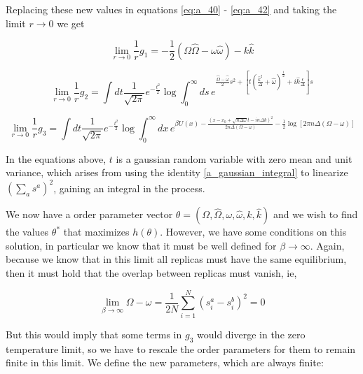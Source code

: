 Replacing these new values in equations \eqref{eq:a_40} - \eqref{eq:a_42} and taking the limit $r\to 0$ we get

\begin{equation}
  \label{eq:a_46}
  \lim_{r\to 0} \frac{1}{r} g_1 = -\frac{1}{2}\left(\Omega\hat{\Omega}
    - \omega \hat{\omega}\right) - k\hat{k}
\end{equation}

\begin{equation}
  \label{eq:a_47}
  \lim_{r\to 0} \frac{1}{r} g_2 = \int dt \frac{1}{\sqrt{2\pi}}
  e^{-\frac{t^2}{2}} \log \int_0^\infty ds \, e^{\frac{\hat{\Omega} -
      \hat{\omega}}{2} s^2 + \left[t\left(\frac{\hat{k}^2}{\Delta} +
      \hat{\omega}\right)^{\frac{1}{2}} +
    i\hat{k}\frac{\epsilon}{\Delta}\right] s}
\end{equation}

\begin{equation}
  \label{eq:a_47}
  \lim_{r\to 0} \frac{1}{r} g_3 = \int dt \frac{1}{\sqrt{2\pi}}
  e^{-\frac{t^2}{2}} \log \int_0^\infty dx \, e^{\beta U(x) -
    \frac{\left(x-x_0 + \sqrt{n\Delta \omega} t - i n \Delta
        k\right)^2}{2n\Delta(\Omega - \omega)} - \frac{1}{2} \log[2\pi
    n \Delta(\Omega - \omega)]}
\end{equation}

In the equations above, $t$ is a gaussian random variable with zero mean and unit variance, which arises from using the identity \eqref{a_gaussian_integral} to linearize $\left(\sum_a s^a\right)^2$, gaining an integral in the process.

We now have a order parameter vector $\theta = (\Omega, \hat{\Omega}, \omega, \hat{\omega}, k, \hat{k})$ and we wish to find the values $\theta^\ast$ that maximizes $h(\theta)$. However, we have some conditions on this solution, in particular we know that it must be well defined for $\beta \to \infty$. Again, because we know that in this limit all replicas must have the same equilibrium, then it must hold that the overlap between replicas must vanish, ie,

\begin{equation}
  \lim_{\beta\to \infty} \Omega - \omega = \frac{1}{2N} \sum_{i=1}^N \left(s_i^a - s_i^b \right)^2 = 0
\end{equation}

But this would imply that some terms in $g_3$ would diverge in the zero temperature limit, so we have to rescale the order parameters for them to remain finite in this limit. We define the new parameters, which are always finite:

